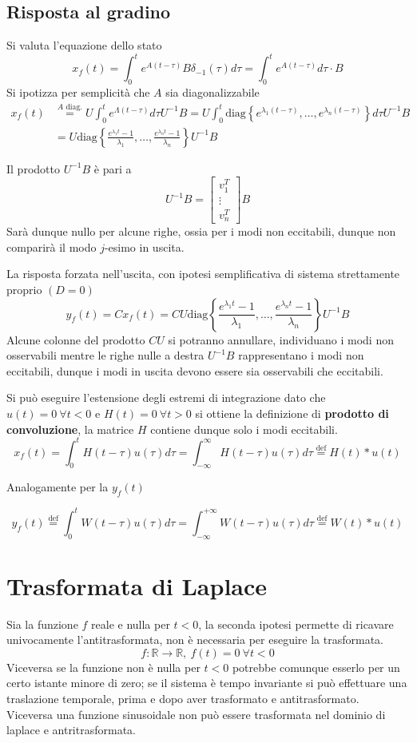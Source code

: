 \subsection{Risposta al gradino}
Si valuta l'equazione dello stato
$$
x_f(t) = \int_0^t e^{A(t-\tau)}B\delta_{-1}(\tau)d\tau =
\int_0^t e^{A(t-\tau)} d\tau\cdot B
$$
Si ipotizza per semplicità che $A$ sia
diagonalizzabile
$$\begin{aligned}
x_f(t)&\stackrel{A\text{ diag.}}{=}
U\int_0^t e^{\Lambda(t-\tau)}d\tau U^{-1} B = U
\int_0^t\text{diag}\left\{e^{\lambda_1(t-\tau)}
,\ldots,e^{\lambda_n(t-\tau)}
\right\} d \tau U^{-1}B\\
&= U\text{diag}\left\{
\frac{e^{\lambda_1t}-1}{\lambda_1},\ldots,\frac{e^{\lambda_nt}-1}{\lambda_n}
\right\}U^{-1}B
\end{aligned}$$

Il prodotto $U^{-1}B$ è pari a
$$
U^{-1}B = \begin{bmatrix}
           v_1^T \\
           \vdots \\
           v_n^T
          \end{bmatrix}B
$$
Sarà dunque nullo per alcune righe, ossia per i modi non eccitabili, dunque non
comparirà il modo $j$-esimo in uscita.

La risposta forzata nell'uscita, con ipotesi semplificativa di sistema
strettamente proprio $(D=0)$
$$
y_f(t) = Cx_f(t) = CU\text{diag}\left\{
\frac{e^{\lambda_1t}-1}{\lambda_1},\ldots,\frac{e^{\lambda_nt}-1}{\lambda_n}
\right\}U^{-1}B
$$
Alcune colonne del prodotto $CU$ si potranno annullare, individuano i modi non
osservabili mentre le righe nulle a destra $U^{-1}B$ rappresentano i modi non
eccitabili, dunque i modi in uscita devono essere sia osservabili che
eccitabili.

Si può eseguire l'estensione degli estremi di integrazione dato che
$u(t)=0\ \forall t<0$ e $H(t) = 0\ \forall t>0$
si ottiene la definizione di \textbf{prodotto di convoluzione}, la matrice $H$
contiene dunque solo i modi eccitabili.
$$
x_f(t) = \int_0^t H(t-\tau) u(\tau) d\tau = \int_{-\infty}^{\infty} H(t-\tau)
u(\tau)d\tau \stackrel{\text{def}}{=} H(t)*u(t)
$$

Analogamente per la $y_f(t)$

$$
y_f(t) \stackrel{\text{def}}{=} \int_0^t W(t-\tau)u(\tau)d\tau =
\int_{-\infty}^{+\infty}W(t-\tau)u(\tau)d\tau \stackrel{\text{def}}{=}W(t)*u(t)
$$

\newpage
\section{Trasformata di Laplace}
Sia la funzione $f$ reale e nulla per $t<0$, la seconda ipotesi permette di
ricavare univocamente l'antitrasformata, non è necessaria per eseguire la
trasformata.
$$
f:\mathbb{R}\to\mathbb{R},\ f(t)=0\ \forall t <0
$$
Viceversa se la funzione non è nulla per $t<0$
potrebbe comunque esserlo per un certo istante minore di zero; se il sistema è
tempo invariante si può effettuare una traslazione temporale, prima e dopo aver
trasformato e antitrasformato.
Viceversa una funzione sinusoidale non può essere trasformata nel dominio di
laplace e antritrasformata.

